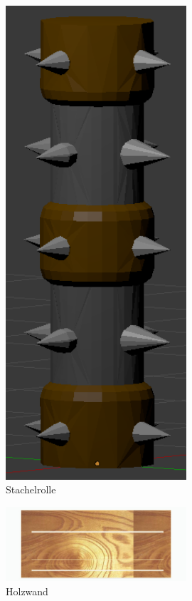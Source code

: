 \documentclass[12pt]{article}
\begin{document}
\begin{figure}
	\centering
	\includegraphics[width=0.6\textwidth]{stachelrolle}
	\caption{Stachelrolle
		\label{fig:spikeroll}}
\end{figure}

\begin{figure}
	\centering
	\includegraphics[width=0.6\textwidth]{Holzwandhindernis}
	\caption{Holzwand
		\label{fig:woodwall}}
\end{figure}
\end{document}
